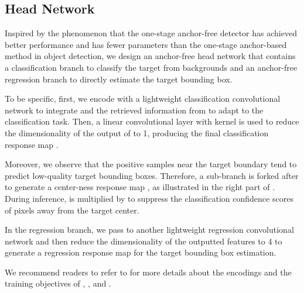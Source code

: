 \documentclass[final]{cvpr}
\begin{document}
\subsection{Head Network}\label{subsec:head-network}
Inspired by the phenomenon that the one-stage anchor-free detector \cite{tian2019fcos} has achieved better performance and has fewer parameters than the one-stage anchor-based method \cite{lin2017focal} in object detection, we design an anchor-free head network that contains a classification branch to classify the target from backgrounds and an anchor-free regression branch to directly estimate the target bounding box.
\par
To be specific, first, we encode  with a lightweight classification convolutional network  to integrate  and the retrieved information from  to adapt to the classification task.
Then, a linear convolutional layer with  kernel is used to reduce the dimensionality of the output of  to 1, producing the final classification response map .
\par
Moreover, we observe that the positive samples near the target boundary tend to predict low-quality target bounding boxes.
Therefore, a sub-branch is forked after  to generate a center-ness response map , as illustrated in the right part of .
During inference,  is multiplied by  to suppress the classification confidence scores of pixels away from the target center.
\par
In the regression branch, we pass  to another lightweight regression convolutional network  and then reduce the dimensionality of the outputted features to 4 to generate a regression response map  for the target bounding box estimation.
\par
We recommend readers to refer to \cite{xu2020siamfc++} for more details about the encodings and the training objectives of , , and .
\end{document}
